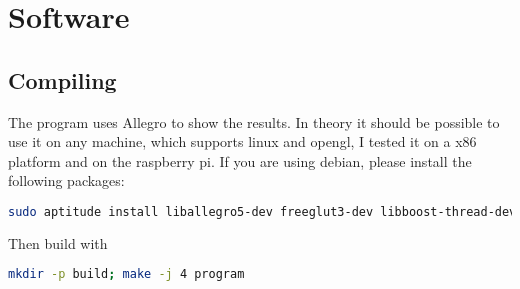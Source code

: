 \documentclass[11pt, a4paper, UKenglish, parskip=half+]{scrbook}
\begin{document}
\begin{comment}
	
\begin{tikzpicture}[scale=2]
  \draw[color=black, thick]
  \foreach \i in {0,...,1}
  {
  	\foreach \j in {0,...,20}
  	{
  		(\i/4,\j/4) to [short,o-] (\i/4,\j/4){}
  	}
  }
  
    (1,0) to [short,o-] (6,0){} %
    (0,1) node[]{\large{\textbf{RASPBERRY PI}}}
    (5,0) node[ground]{} node[circ](4.5,0){}
    (0,2) to [pC, l=$C_1$, o-] (0.5,2)
    to [R,l=$R_1$,](1.5,2)
    to node[short]{}(2.6,2)
    (1.5,2) to [C, l=$C_2$, *-] (1.5,3) -| (5,3)
    (2.2,2) to [R, l=$R_2$, *-*] (2.2,3)
    (2.2,3) to [pC, l=$C_3$, *-] (2.2,5) -| (3,5)
    (3,0) to [R,l=$R_5$,-*] (3,1.5)
    to [Tnpn,n=npn1] (3,2.5)
    (npn1.E) node[right=3mm, above=5mm]{$Q_1$} %
    (4,0) to [pC, l_=$C_4$, *-] (4, 1.5)--(3,1.5)
    (2.2,0) to [vR, l=$R_3$, *-*] (2.2,2)
    (3,2.5) to node[short]{}(3,3)
    (3,5) to [pR, n=pot1, l_=$R_4$, *-] (3,3)
    (3,5) to [R, l=$R_6$, *-] (5,5)
    to [short,*-o](5,5.5) node[right]{$V_S=40 V$}
    (5,3) to [Tnigfetd,n=mos1] (5,5)
    (mos1.B) node[anchor=west]{$Q_2$} %
    (pot1.wiper)  to [R, l=$R_7$] (4.5,4) -| (mos1.G)
    (5,1.5) to [Tpigfetd,n=mos2] (5,2.5)
    (5,0) to (mos2.S)
    (3,2.5) to [R, l=$R_8$, *-] (4.5,2.5)
    -| (mos2.G)
    (mos2.B) node[anchor=west]{$Q_3$} %
    (6,3) to [pC, l=$C_5$,-*](5,3)
    (6,3) to [short,-o] (6,2){}
    (mos1.S)--(mos2.D)
    (6,0) to [short,-o] (6,1){} node[above=7mm]{\large{\textbf{SPEAKER}}}
    ;
\end{tikzpicture}
\end{comment}
\chapter{Software}
\section{Compiling}
The program uses Allegro to show the results. In theory it should be possible to use it on any machine, which supports linux and opengl, I tested it on a x86 platform and on the raspberry pi. If you are using debian, please install the following packages:
\begin{lstlisting}[language=bash,caption={Required packages},breaklines=true]
sudo aptitude install liballegro5-dev freeglut3-dev libboost-thread-dev libboost-system-dev
\end{lstlisting}
Then build with
\begin{lstlisting}[language=bash,caption={Compile},breaklines=true]
mkdir -p build; make -j 4 program
\end{lstlisting}
\end{document}
